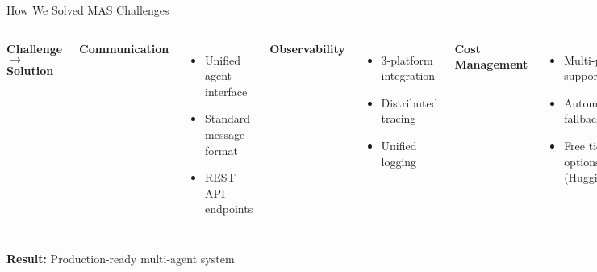 \documentclass[aspectratio=169,11pt]{beamer}
\begin{document}
\begin{frame}{How We Solved MAS Challenges}

\begin{columns}
\textbf{Challenge $\rightarrow$ Solution}

 \textbf{Communication}
\begin{itemize}
    \item Unified agent interface
    \item Standard message format
    \item REST API endpoints
\end{itemize}

 \textbf{Observability}
\begin{itemize}
    \item 3-platform integration
    \item Distributed tracing
    \item Unified logging
\end{itemize}

 \textbf{Cost Management}
\begin{itemize}
    \item Multi-provider support
    \item Automatic fallback
    \item Free tier options (HuggingFace)
\end{itemize}

 \textbf{Deployment}
\begin{itemize}
    \item Docker containerization
    \item Service orchestration
    \item Health monitoring
\end{itemize}
\end{columns}

\vspace{0.3cm}
\begin{center}
\textbf{Result:} Production-ready multi-agent system
\end{center}
\end{frame}
\end{document}
